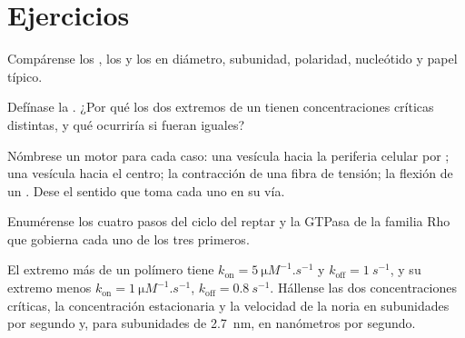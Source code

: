 \section{Ejercicios}

\begin{exercise}[$\star$]\label{exo:b3:cytoskeleton-motility:1}
Compárense los , los  y los  en diámetro, subunidad, polaridad, nucleótido y papel típico.
\end{exercise}

\begin{exercise}[$\star$]\label{exo:b3:cytoskeleton-motility:2}
Defínase la . ¿Por qué los dos extremos de un
 tienen concentraciones críticas distintas, y qué
ocurriría si fueran iguales?
\end{exercise}

\begin{exercise}[$\star$]\label{exo:b3:cytoskeleton-motility:3}
Nómbrese un motor para cada caso: una vesícula hacia la periferia
celular por ; una vesícula hacia el centro; la contracción de
una fibra de tensión; la flexión de un . Dese el sentido que toma
cada uno en su vía.
\end{exercise}

\begin{exercise}[$\star$]\label{exo:b3:cytoskeleton-motility:4}
Enumérense los cuatro pasos del ciclo del reptar y la GTPasa de la
familia Rho que gobierna cada uno de los tres primeros.
\end{exercise}

\begin{exercise}[$\star\star$]\label{exo:b3:cytoskeleton-motility:5}
El extremo más de un polímero tiene
$k_{\text{on}} = \qty{5}{\micro M^{-1}.s^{-1}}$ y
$k_{\text{off}} = \qty{1}{s^{-1}}$, y su extremo menos $k_{\text{on}} =
\qty{1}{\micro M^{-1}.s^{-1}}$, $k_{\text{off}} = \qty{0.8}{s^{-1}}$.
Hállense las dos concentraciones críticas, la concentración estacionaria
y la velocidad de la noria en subunidades por segundo y, para subunidades
de \qty{2.7}{nm}, en nanómetros por segundo.
\end{exercise}


